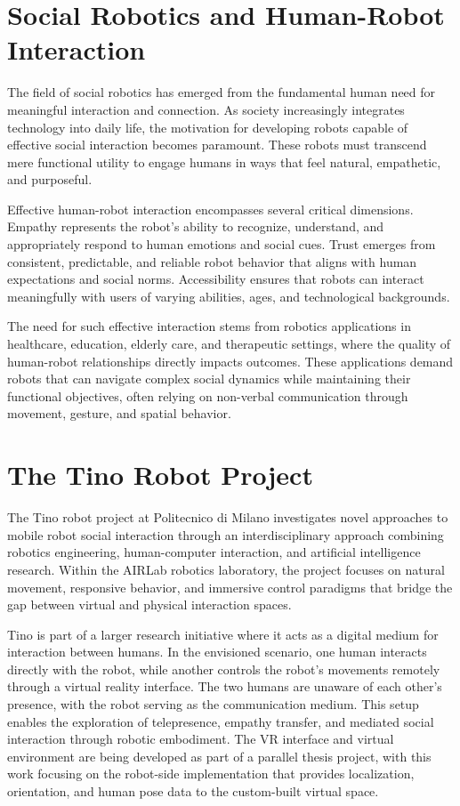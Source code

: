 \section{Social Robotics and Human-Robot Interaction}
The field of social robotics has emerged from the fundamental human need for meaningful interaction and connection. As society increasingly integrates technology into daily life, the motivation for developing robots capable of effective social interaction becomes paramount. These robots must transcend mere functional utility to engage humans in ways that feel natural, empathetic, and purposeful.

Effective human-robot interaction encompasses several critical dimensions. Empathy represents the robot's ability to recognize, understand, and appropriately respond to human emotions and social cues. Trust emerges from consistent, predictable, and reliable robot behavior that aligns with human expectations and social norms. Accessibility ensures that robots can interact meaningfully with users of varying abilities, ages, and technological backgrounds.

The need for such effective interaction stems from robotics applications in healthcare, education, elderly care, and therapeutic settings, where the quality of human-robot relationships directly impacts outcomes. These applications demand robots that can navigate complex social dynamics while maintaining their functional objectives, often relying on non-verbal communication through movement, gesture, and spatial behavior.

\section{The Tino Robot Project}
The Tino robot project at Politecnico di Milano investigates novel approaches to mobile robot social interaction through an interdisciplinary approach combining robotics engineering, human-computer interaction, and artificial intelligence research. Within the AIRLab robotics laboratory, the project focuses on natural movement, responsive behavior, and immersive control paradigms that bridge the gap between virtual and physical interaction spaces.

Tino is part of a larger research initiative where it acts as a digital medium for interaction between humans. In the envisioned scenario, one human interacts directly with the robot, while another controls the robot's movements remotely through a virtual reality interface. The two humans are unaware of each other's presence, with the robot serving as the communication medium. This setup enables the exploration of telepresence, empathy transfer, and mediated social interaction through robotic embodiment. The VR interface and virtual environment are being developed as part of a parallel thesis project, with this work focusing on the robot-side implementation that provides localization, orientation, and human pose data to the custom-built virtual space.

